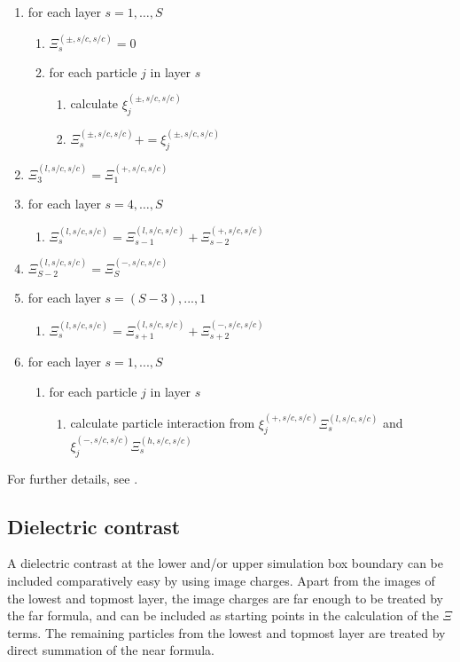\begin{enumerate}
\item for each layer $s=1,\ldots,S$ 
  \begin{enumerate}
  \item $\Xi^{(\pm,s/c,s/c)}_s=0$
  \item for each particle $j$ in layer $s$
    \begin{enumerate}
    \item calculate $\xi^{(\pm,s/c,s/c)}_j$
    \item $\Xi^{(\pm,s/c,s/c)}_s += \xi^{(\pm,s/c,s/c)}_j$
    \end{enumerate}
  \end{enumerate}
\item $\Xi^{(l,s/c,s/c)}_3=\Xi^{(+,s/c,s/c)}_1$
\item for each layer $s=4,\ldots,S$
  \begin{enumerate}
  \item $\Xi^{(l,s/c,s/c)}_s=\Xi^{(l,s/c,s/c)}_{s-1} +
    \Xi^{(+,s/c,s/c)}_{s-2}$
  \end{enumerate}
\item $\Xi^{(l,s/c,s/c)}_{S-2}=\Xi^{(-,s/c,s/c)}_S$
\item for each layer $s=(S-3),...,1$ 
  \begin{enumerate}
  \item $\Xi^{(l,s/c,s/c)}_s=\Xi^{(l,s/c,s/c)}_{s+1} +
    \Xi^{(-,s/c,s/c)}_{s+2}$
  \end{enumerate}
\item for each layer $s=1,...,S$
  \begin{enumerate}
  \item for each particle $j$ in layer $s$ 
    \begin{enumerate}
    \item calculate particle interaction from
      $\xi^{(+,s/c,s/c)}_j\Xi^{(l,s/c,s/c)}_s$ and
      $\xi^{(-,s/c,s/c)}_j\Xi^{(h,s/c,s/c)}_s$
    \end{enumerate}
  \end{enumerate}
\end{enumerate}

For further details, see
\citet{mmm2d,arnold02b,elc}.

\subsection{Dielectric contrast}

A dielectric contrast at the lower and/or upper simulation box
boundary can be included comparatively easy by using image charges.
Apart from the images of the lowest and topmost layer, the image
charges are far enough to be treated by the far formula, and can be
included as starting points in the calculation of the $\Xi$ terms. The
remaining particles from the lowest and topmost layer are treated by
direct summation of the near formula.

